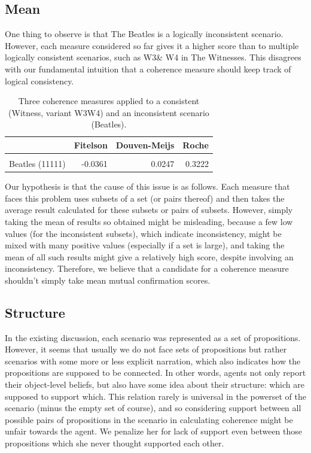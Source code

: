 \documentclass[10pt,]{scrartcl}
\begin{document}
\subsection{Mean}\label{sec:mean}

One thing to observe is that \textsf{The Beatles} is a logically inconsistent scenario. However, each  measure considered so far gives it a higher score than to multiple  logically consistent scenarios, such as \textsf{W3}\& \textsf{W4} in  \textsf{The Witnesses}. This  disagrees with our fundamental
intuition that a coherence measure should keep track of logical
consistency. 



\begin{table}
\centering
\begin{tabular}{lrrr}
\toprule
  & Fitelson & Douven-Meijs & Roche\\
\midrule
\cellcolor{gray!6}{Witness W3W4 (11)} & \cellcolor{gray!6}{-0.2336} & \cellcolor{gray!6}{-0.1103} & \cellcolor{gray!6}{0.3147}\\
Beatles (11111) & -0.0361 & 0.0247 & 0.3222\\
\bottomrule
\end{tabular}
\caption{Three coherence measures applied to a consistent  (Witness, variant W3W4) and an inconsistent scenario (Beatles).}
\end{table}

Our hypothesis is that the cause of this issue is as follows. Each measure that faces this problem  uses subsets of a set (or pairs thereof) and then takes the average
result calculated for these subsets or pairs of subsets. However, simply
taking the mean of results so obtained might be misleading, because a
few low values (for the inconsistent subsets), which indicate
inconsistency, might be mixed with many positive values (especially if a
set is large), and taking the mean of all such results might give a
relatively high score, despite involving an inconsistency. Therefore, we
believe that a candidate for a coherence measure shouldn't simply take
mean mutual confirmation scores.

\subsection{Structure}

In the existing discussion, each scenario was represented as a set of
propositions. However, it seems that usually we do not face sets of
propositions but rather scenarios with some more or less explicit
narration, which also indicates how the propositions are supposed to be
connected. In other words, agents not only report their object-level
beliefs, but also have some idea about their structure: which are
supposed to support which. This relation rarely is universal in the
powerset of the scenario (minus the empty set of course), and so
considering support between all possible pairs of propositions in the
scenario in calculating coherence might be unfair towards the agent. We
penalize her for lack of support even between those propositions which
she never thought supported each other.
\end{document}
